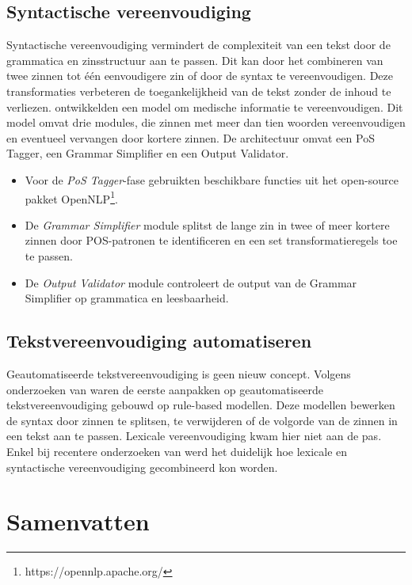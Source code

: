 \subsection{Syntactische vereenvoudiging}
Syntactische vereenvoudiging vermindert de complexiteit van een tekst door de grammatica en zinsstructuur aan te passen. Dit kan door het combineren van twee zinnen tot één eenvoudigere zin of door de syntax te vereenvoudigen. Deze transformaties verbeteren de toegankelijkheid van de tekst zonder de inhoud te verliezen. \textcite{Kandula2010} ontwikkelden een model om medische informatie te vereenvoudigen. Dit model omvat drie modules, die zinnen met meer dan tien woorden vereenvoudigen en eventueel vervangen door kortere zinnen. De architectuur omvat een PoS Tagger, een Grammar Simplifier en een Output Validator.

\begin{itemize}
	\item Voor de \textit{PoS Tagger}-fase gebruikten \textcite{Kandula2010} beschikbare functies uit het open-source pakket OpenNLP\footnote{https://opennlp.apache.org/}.
	\item De \textit{Grammar Simplifier} module splitst de lange zin in twee of meer kortere zinnen door POS-patronen te identificeren en een set transformatieregels toe te passen.
	\item De \textit{Output Validator} module controleert de output van de Grammar Simplifier op grammatica en leesbaarheid.
\end{itemize}  

\subsection{Tekstvereenvoudiging automatiseren}
Geautomatiseerde tekstvereenvoudiging is geen nieuw concept. Volgens onderzoeken van \textcite{Canning2000, Siddharthan2006} waren de eerste aanpakken op geautomatiseerde tekstvereenvoudiging gebouwd op rule-based modellen. Deze modellen bewerken de syntax door zinnen te splitsen, te verwijderen of de volgorde van de zinnen in een tekst aan te passen. Lexicale vereenvoudiging kwam hier niet aan de pas. Enkel bij recentere onderzoeken van \textcite{Coster2011, Bulte2018} werd het duidelijk hoe lexicale en syntactische vereenvoudiging gecombineerd kon worden.

\section{Samenvatten}


